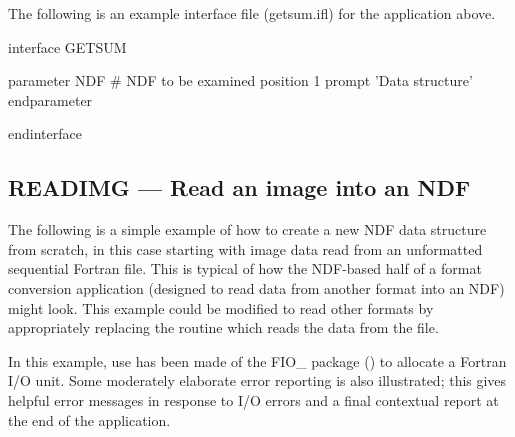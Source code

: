 \documentclass[twoside,11pt,nolof]{starlink}
\begin{document}
The following is an example  interface file
(getsum.ifl) for the application above.

\small
\begin{terminalv}
interface GETSUM

   parameter NDF                 # NDF to be examined
      position 1
      prompt   'Data structure'
   endparameter

endinterface
\end{terminalv}
\normalsize

\newpage
\subsection{READIMG --- Read an image into an NDF}

The following is a simple example of how to create a new NDF data
structure from scratch, in this case starting with image data read
from an unformatted sequential Fortran file. This is typical of how
the NDF-based half of a format conversion application (designed to
read data from another format into an NDF) might look. This example
could be modified to read other formats by appropriately replacing the
routine which reads the data from the file.

In this example, use has been made of the FIO\_ package
() to allocate a Fortran I/O unit. Some
moderately elaborate error reporting is also illustrated; this gives
helpful error messages in response to I/O errors and a final
contextual report at the end of the application.
\end{document}
